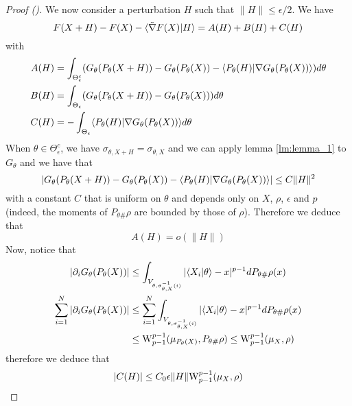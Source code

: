\begin{proof} [Proof ()]
    We now consider a perturbation $H$ such that $\|H\| \leq \epsilon/2$. We have
    \begin{equation}
        F(X+H) - F(X) - \langle\tilde{\nabla}F(X)|H\rangle = A(H) + B(H) + C(H)
    \end{equation}
    with
    \begin{align}
        A(H) &= \int_{\Theta_{\epsilon}^c} (G_\theta(P_\theta(X+H)) - G_\theta(P_\theta(X)) - \langle P_\theta(H)|\nabla G_\theta(P_\theta(X))\rangle) d\theta \\
        B(H) &= \int_{\Theta_{\epsilon}} (G_\theta(P_\theta(X+H)) - G_\theta(P_\theta(X))) d\theta \\
        C(H) &= - \int_{\Theta_{\epsilon}} \langle P_\theta(H)|\nabla G_\theta(P_\theta(X))\rangle d\theta
    \end{align}
    When $\theta \in \Theta_\epsilon^c$, we have $\sigma_{\theta,X+H} = \sigma_{\theta,X}$ and we can apply lemma \ref{lm:lemma_1} to $G_\theta$ and we have that 
    \begin{equation}
        \left| G_\theta(P_\theta(X+H)) - G_\theta(P_\theta(X)) - \langle P_\theta(H)|\nabla G_\theta(P_\theta(X))\rangle \right| \leq C \|H\|^2
    \end{equation}
    with a constant $C$ that is uniform on $\theta$ and depends only on $X$, $\rho$, $\epsilon$ and $p$ (indeed, the moments of $P_{\theta\#}\rho$ are bounded by those of $\rho$). Therefore we deduce that
    \begin{equation}
        A(H) = o(\|H\|)
    \end{equation}
    Now, notice that 
    \begin{align}
        |\partial_i G_\theta(P_\theta(X))| 
            &\leq \int_{V_{\theta,\sigma_{\theta,X}^{-1}(i)}} |\langle X_i|\theta\rangle - x|^{p-1} dP_{\theta\#}\rho(x) \\
        \sum_{i=1}^N | \partial_i G_\theta(P_\theta(X)) | 
            &\leq \sum_{i=1}^N \int_{V_{\theta,\sigma_{\theta,X}^{-1}(i)}} |\langle X_i|\theta\rangle - x|^{p-1} dP_{\theta\#}\rho(x) \\
            &\leq \mathrm{W}_{p-1}^{p-1}(\mu_{P_\theta(X)},P_{\theta\#}\rho) \leq \mathrm{W}_{p-1}^{p-1}(\mu_X,\rho) \\
    \end{align}
    therefore we deduce that
    \begin{equation}
        |C(H)| \leq C_0\epsilon\|H\|\mathrm{W}_{p-1}^{p-1}(\mu_X,\rho)
    \end{equation}


\end{proof}
